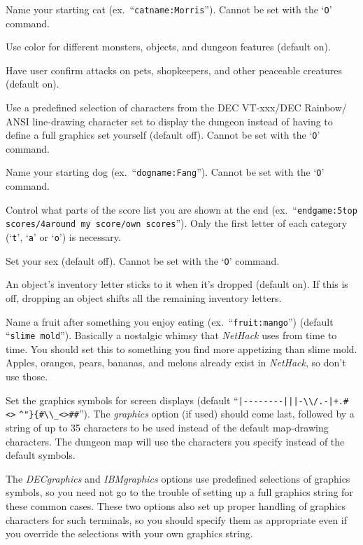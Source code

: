 \blist{}
\item[\ib{catname}]
Name your starting cat (ex.\ ``{\tt catname:Morris}'').
Cannot be set with the `{\tt O}' command.
\item[\ib{color}]
Use color for different monsters, objects, and dungeon features (default on).
\item[\ib{confirm}]
Have user confirm attacks on pets, shopkeepers, and other
peaceable creatures (default on).
\item[\ib{DECgraphics}]
Use a predefined selection of characters from the DEC VT-xxx/DEC Rainbow/
ANSI line-drawing character set to display the dungeon instead of having
to define a full graphics set yourself (default off).
Cannot be set with the `{\tt O}' command.
\item[\ib{dogname}]
Name your starting dog (ex.\ ``{\tt dogname:Fang}'').
Cannot be set with the `{\tt O}' command.
\item[\ib{endgame}]
Control what parts of the score list you are shown at the end (ex.\
``{\tt endgame:5top scores/4around my score/own scores}'').  Only the first
letter of each category (`{\tt t}', `{\tt a}' or `{\tt o}') is necessary.
\item[\ib{female}]
Set your sex (default off). Cannot be set with the `{\tt O}' command.
\item[\ib{fixinvlet}]
An object's inventory letter sticks to it when it's dropped (default on).
If this is off, dropping an object shifts all the remaining inventory letters.
\item[\ib{fruit}]
Name a fruit after something you enjoy eating (ex.\ ``{\tt fruit:mango}'')
(default ``{\tt slime mold}''). Basically a nostalgic whimsy that
{\it NetHack\/} uses from time to time.  You should set this to something you
find more appetizing than slime mold.  Apples, oranges, pears, bananas, and
melons already exist in {\it NetHack}, so don't use those.
\item[\ib{graphics}]
Set the graphics symbols for screen displays (default
``\verb&|--------|||-\\/.-|+.#<>& \verb&^"}{#\\_<>##&''). The
{\it graphics\/}
option (if used) should come last, followed by a string of up to 35
characters to be used instead of the default map-drawing characters.
The dungeon map will use the characters you specify instead of the
default symbols.

The
{\it DECgraphics\/}
and
{\it IBMgraphics\/}
options use predefined selections of graphics symbols, so you need not
go to the trouble of setting up a full graphics string for these common
cases.  These two options also set up proper handling of graphics
characters for such terminals, so you should specify them as appropriate
even if you override the selections with your own graphics string.

